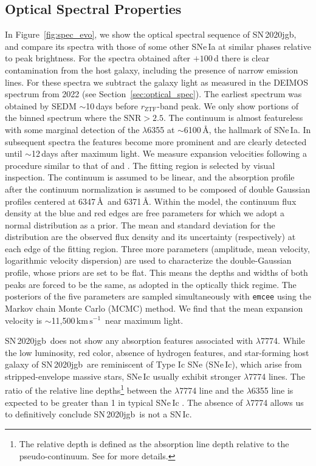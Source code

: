 \documentclass[twocolumn]{aastex631}
\newcommand{\sn}{SN\,2020jgb}
\newcommand{\kms}{$\mathrm{km}\,\mathrm{s}^{-1}$}
\begin{document}
\subsection{Optical Spectral Properties}
In Figure~\ref{fig:spec_evo}, we show the optical spectral sequence of \sn, and compare its spectra with those of some other SNe\,Ia at similar phases relative to peak brightness. For the spectra obtained after $+100$\,d there is clear contamination from the host galaxy, including the presence of narrow emission lines. For these spectra we subtract the galaxy light as measured in the DEIMOS spectrum from 2022 (see Section~\ref{sec:optical_spec}). The earliest spectrum was obtained by SEDM $\sim$10\,days before $r_\mathrm{ZTF}$-band peak. We only show portions of the binned spectrum where the $\mathrm{SNR}>2.5$. The continuum is almost featureless with some marginal detection of the  $\lambda$6355 at $\sim$6100\,\AA, the hallmark of SNe\,Ia. In subsequent spectra the  features become more prominent and are clearly detected until $\sim$12\,days after maximum light. We measure  expansion velocities following a procedure similar to that of  \citet{Childress_2013,Childress_2014} and \citet{Maguire_2014}. The fitting region is selected by visual inspection. The continuum is assumed to be linear, and the absorption profile after the continuum normalization is assumed to be composed of double Gaussian profiles centered at 6347\,\AA\ and 6371\,\AA. Within the model, the continuum flux density at the blue and red edges are free parameters for which we adopt a normal distribution as a prior. The mean and standard deviation for the distribution are the observed flux density and its uncertainty (respectively) at each edge of the fitting region. Three more parameters (amplitude, mean velocity, logarithmic velocity dispersion) are used to characterize the double-Gaussian profile, whose priors are set to be flat. This means the depths and widths of both peaks are forced to be the same, as \citet{Maguire_2014} adopted in the optically thick regime. The posteriors of the five parameters are sampled simultaneously with \texttt{emcee} \citep{emcee_2013} using the Markov chain Monte Carlo (MCMC) method. We find that the mean expansion velocity is $\sim$11,500\,\kms\ near maximum light.

\sn\ does not show any absorption features associated with  $\lambda$7774. While the low luminosity, red color, absence of hydrogen features, and star-forming host galaxy of \sn\ are reminiscent of Type Ic SNe (SNe\,Ic), which arise from stripped-envelope massive stars, SNe\,Ic usually exhibit stronger  $\lambda$7774 lines. The ratio of the relative line depths\footnote{The relative depth is defined as the absorption line depth relative to the pseudo-continuum. See \citet{Sun_2017} for more details.} between the  $\lambda$7774 line and the  $\lambda$6355 line is expected to be greater than 1 in typical SNe\,Ic \citep{Sun_2017, Gal-Yam_2017}. The absence of  $\lambda$7774 allows us to definitively conclude \sn\ is not a SN\,Ic.
\end{document}
